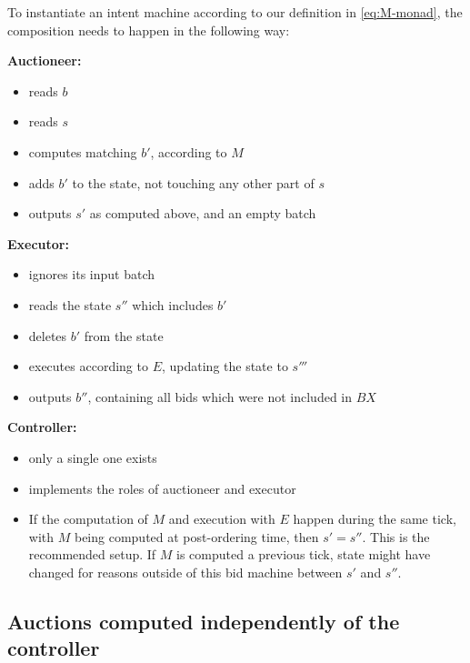 To instantiate an intent machine according to our definition in \eqref{eq:M-monad}, the composition needs to happen in the following way:

\vspace{1em}
\noindent\textbf{Auctioneer:}
\begin{itemize}
    \item reads $b$
    \item reads $s$
    \item computes matching $b'$, according to $M$
    \item adds $b'$ to the state, not touching any other part of $s$
    \item outputs $s'$ as computed above, and an empty batch
\end{itemize}

\vspace{1em}
\noindent\textbf{Executor:}
\begin{itemize}
    \item ignores its input batch
    \item reads the state $s''$ which includes $b'$
    \item deletes $b'$ from the state
    \item executes according to $E$, updating the state to $s'''$
    \item outputs $b''$, containing all bids which were not included in $BX$
\end{itemize}

\vspace{1em}

\noindent\textbf{Controller:}
\begin{itemize}
    \item only a single one exists
    \item implements the roles of auctioneer and executor
    \item If the computation of $M$ and execution with $E$ happen during the same tick, with $M$ being computed at post-ordering time, then $s' = s''$. This is the recommended setup. If $M$ is computed a previous tick, state might have changed for reasons outside of this bid machine between $s'$ and $s''$.
\end{itemize}

\subsection{Auctions computed independently of the controller}

